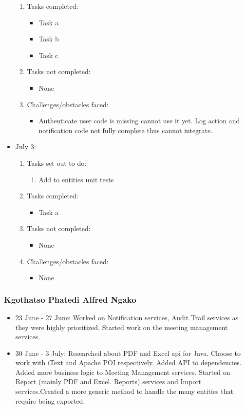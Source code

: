 \documentclass[12pt]{article}
\begin{document}
\begin{itemize}
\begin{enumerate}
		\item Tasks completed:
		\begin{itemize}
			\item Task a
			\item Task b
			\item Task c								
		\end{itemize}
		\item Tasks not completed:
		\begin{itemize}
			\item None
		\end{itemize}
		\item Challenges/obstacles faced:
		\begin{itemize}
			\item Authenticate user code is missing cannot use it yet. Log action and notification code not fully complete thus cannot integrate.
		\end{itemize}			
	\end{enumerate}
	\item July 3:
	\begin{enumerate}
		\item Tasks set out to do:
		\begin{enumerate}
			\item Add to entities unit tests			
		\end{enumerate}
		\item Tasks completed:
		\begin{itemize}
			\item Task a								
		\end{itemize}
		\item Tasks not completed:
		\begin{itemize}
			\item None
		\end{itemize}
		\item Challenges/obstacles faced:
		\begin{itemize}
			\item None
		\end{itemize}			
	\end{enumerate}
\end{itemize}

\subsubsection{Kgothatso Phatedi Alfred Ngako}
\begin{itemize}
	\item 23 June - 27 June: Worked on Notification services, Audit Trail services as they were highly prioritized. Started work on the meeting management services.
	\item 30 June - 3 July: Researched about PDF and Excel api for Java. Choose to work with iText and Apache POI respectively. Added API to dependencies. Added more business logic to Meeting Management services. Started on Report (mainly PDF and Excel. Reports) services and Import services.Created a more generic method to handle the many entities that require being exported.	
\end{itemize}
\end{document}
